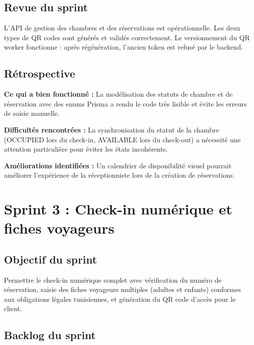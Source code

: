 \subsection{Revue du sprint}

L'API de gestion des chambres et des réservations est opérationnelle. Les deux types de QR codes sont générés et validés correctement. Le versionnement du QR worker fonctionne : après régénération, l'ancien token est refusé par le backend.

\subsection{Rétrospective}

\textbf{Ce qui a bien fonctionné :} La modélisation des statuts de chambre et de réservation avec des enums Prisma a rendu le code très lisible et évite les erreurs de saisie manuelle.

\textbf{Difficultés rencontrées :} La synchronisation du statut de la chambre (OCCUPIED lors du check-in, AVAILABLE lors du check-out) a nécessité une attention particulière pour éviter les états incohérents.

\textbf{Améliorations identifiées :} Un calendrier de disponibilité visuel pourrait améliorer l'expérience de la réceptionniste lors de la création de réservations.

\section{Sprint 3 : Check-in numérique et fiches voyageurs}
\label{sec:sprint3}

\subsection{Objectif du sprint}

Permettre le check-in numérique complet avec vérification du numéro de réservation, saisie des fiches voyageurs multiples (adultes et enfants) conformes aux obligations légales tunisiennes, et génération du QR code d'accès pour le client.

\subsection{Backlog du sprint}

